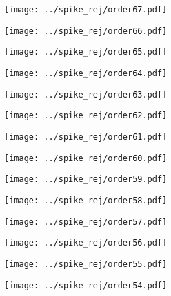\documentclass{article}
\begin{document}
\begin{figure}[H]
    \centering
    \texttt{[image: ../spike\_rej/order67.pdf]}
\end{figure}
\begin{figure}[H]
    \centering
    \texttt{[image: ../spike\_rej/order66.pdf]}
\end{figure}
\begin{figure}[H]
    \centering
    \texttt{[image: ../spike\_rej/order65.pdf]}
\end{figure}
\begin{figure}[H]
    \centering
    \texttt{[image: ../spike\_rej/order64.pdf]}
\end{figure}
\begin{figure}[H]
    \centering
    \texttt{[image: ../spike\_rej/order63.pdf]}
\end{figure}
\begin{figure}[H]
    \centering
    \texttt{[image: ../spike\_rej/order62.pdf]}
\end{figure}
\begin{figure}[H]
    \centering
    \texttt{[image: ../spike\_rej/order61.pdf]}
\end{figure}
\begin{figure}[H]
    \centering
    \texttt{[image: ../spike\_rej/order60.pdf]}
\end{figure}
\begin{figure}[H]
    \centering
    \texttt{[image: ../spike\_rej/order59.pdf]}
\end{figure}
\begin{figure}[H]
    \centering
    \texttt{[image: ../spike\_rej/order58.pdf]}
\end{figure}
\begin{figure}[H]
    \centering
    \texttt{[image: ../spike\_rej/order57.pdf]}
\end{figure}
\begin{figure}[H]
    \centering
    \texttt{[image: ../spike\_rej/order56.pdf]}
\end{figure}
\begin{figure}[H]
    \centering
    \texttt{[image: ../spike\_rej/order55.pdf]}
\end{figure}
\begin{figure}[H]
    \centering
    \texttt{[image: ../spike\_rej/order54.pdf]}
\end{figure}
\end{document}
